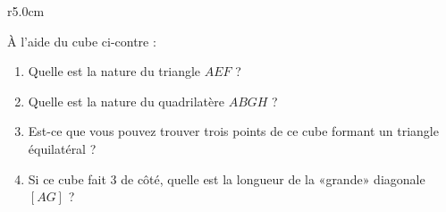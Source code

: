 
\begin{wrapfigure}[3]{r}{5.0cm}
   \vspace{-0.5cm}        %
   \centering
   
\end{wrapfigure}

À l'aide du cube ci-contre :
\begin{enumerate}
    \item
        Quelle est la nature du triangle \( AEF\) ? 
    \item
        Quelle est la nature du quadrilatère \( ABGH\) ?
    \item
        Est-ce que vous pouvez trouver trois points de ce cube formant un triangle équilatéral ?
    \item
        Si ce cube fait \unit{3}{\meter} de côté, quelle est la longueur de la «grande» diagonale \( [AG]\) ?
\end{enumerate}

